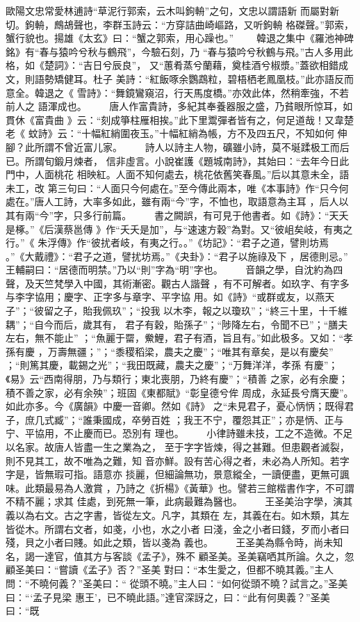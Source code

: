 \documentclass{ctexart}
\begin{document}
歐陽文忠常愛林逋詩``草泥行郭索，云木叫鉤輈''之句，文忠以謂語新 而屬對新切。鉤輈，鷓鴣聲也，李群玉詩云：``方穿詰曲崎嶇路，又听鉤輈 格磔聲。''郭索，蟹行貌也。揚雄《太玄》曰：``蟹之郭索，用心躁也。'' 　　韓退之集中《羅池神碑銘》有``春与猿吟兮秋与鶴飛''，今驗石刻，乃 ``春与猿吟兮秋鶴与飛。''古人多用此格，如《楚詞》：``吉日兮辰良''， 又``蕙肴蒸兮蘭藉，奠桂酒兮椒漿。''蓋欲相錯成文，則語勢矯健耳。杜子 美詩：``紅飯啄余鸚鵡粒，碧梧栖老鳳凰枝。''此亦語反而意全。韓退之《 雪詩》：``舞鏡鸞窺沼，行天馬度橋。''亦效此体，然稍牽強，不若前人之 語渾成也。 　　唐人作富貴詩，多紀其奉養器服之盛，乃貧眼所惊耳，如貫休《富貴曲 》云：``刻成箏柱雁相挨。''此下里鬻彈者皆有之，何足道哉！又韋楚老《 蚊詩》云：``十幅紅綃圍夜玉。''十幅紅綃為帳，方不及四五尺，不知如何 伸腳？此所謂不曾近富儿家。 　　詩人以詩主人物，礦雖小詩，莫不埏蹂极工而后已。所謂旬鍛月煉者， 信非虛言。小說崔護《題城南詩》，其始曰：``去年今日此門中，人面桃花 相映紅。人面不知何處去，桃花依舊笑春風。''后以其意未全，語未工，改 第三句曰：``人面只今何處在。''至今傳此兩本，唯《本事詩》作``只今何 處在。''唐人工詩，大率多如此，雖有兩``今''字，不恤也，取語意為主耳 ，后人以其有兩``今''字，只多行前篇。 　　書之闕誤，有可見于他書者。如《詩》：``天夭是椓。''《后漢蔡邕傳 》作``夭夭是加''，与``速速方穀''為對。又``彼岨矣岐，有夷之行。''《 朱浮傳》作``彼扰者岐，有夷之行。。''《坊記》：``君子之道，譬則坊焉 。''《大戴禮》：``君子之道，譬扰坊焉。''《夬卦》：``君子以施祿及下 ，居德則忌。'' 王輔嗣曰：``居德而明禁。''乃以``則''字為``明''字也。 　　音韻之學，自沈約為四聲，及天竺梵學入中國，其術漸密。觀古人諧聲 ，有不可解者。如玖字、有字多与李字協用；慶字、正字多与章字、平字協 用。如《詩》``或群或友，以燕天子''；``彼留之子，貽我佩玖''；``投我 以木李，報之以瓊玖''；``終三十里，十千維耦''；``自今而后，歲其有， 君子有穀，貽孫子''；``陟降左右，令聞不已''；``膳夫左右，無不能止'' ；``魚麗于罶，鮝鯉，君子有酒，旨且有。''如此极多。又如：``孝孫有慶 ，万壽無疆；''；``黍稷稻梁，農夫之慶''；``唯其有章矣，是以有慶矣'' ；``則篤其慶，載錫之光''；``我田既藏，農夫之慶''；``万舞洋洋，孝孫 有慶''；《易》云``西南得朋，乃与類行；東北喪朋，乃終有慶''；``積善 之家，必有余慶；積不善之家，必有余殃''；班固《東都賦》``彰皇德兮侔 周成，永延長兮膺天慶''。如此亦多。今《廣韻》中慶一音卿。然如《詩》 之``未見君子，憂心怲怲；既得君子，庶几式臧''；``誰秉國成，卒勞百姓 ；我王不宁，覆怨其正''；亦是怲、正与宁、平協用，不止慶而已。恐別有 理也。 　　小律詩雖未技，工之不造微。不足以名家。故唐人皆盡一生之業為之， 至于字字皆煉，得之甚難。但患觀者滅裂，則不見其工，故不唯為之難，知 音亦鮮。設有苦心得之者，未必為人所知。若字字是，皆無瑕可指。語意亦 掞麗，但細論無功，景意縱全，一讀便盡，更無可諷味。此類最易為人激賞 ，乃詩之《折楊》《黃華》也。譬若三館楷書作字，不可謂不精不麗；求其 佳處，到死無一筆，此病最難為醫也。 　　王圣美治字學，演其義以為右文。古之字書，皆從左文。凡字，其類在 左，其義在右。如木類，其左皆從木。所謂右文者，如戔，小也，水之小者 曰淺，金之小者曰錢，歹而小者曰殘，貝之小者曰賤。如此之類，皆以戔為 義也。 　　王圣美為縣令時，尚未知名，謁一達官，值其方与客談《孟子》，殊不 顧圣美。圣美竊哂其所論。久之，忽顧圣美曰：``嘗讀《孟子》否？''圣美 對曰：``本生愛之，但都不曉其義。''主人問：``不曉何義？''圣美曰：`` 從頭不曉。''主人曰：``如何從頭不曉？試言之。''圣美曰：```孟子見梁 惠王'，已不曉此語。''達官深訝之，曰：``此有何奧義？''圣美曰：``既 
\end{document}
